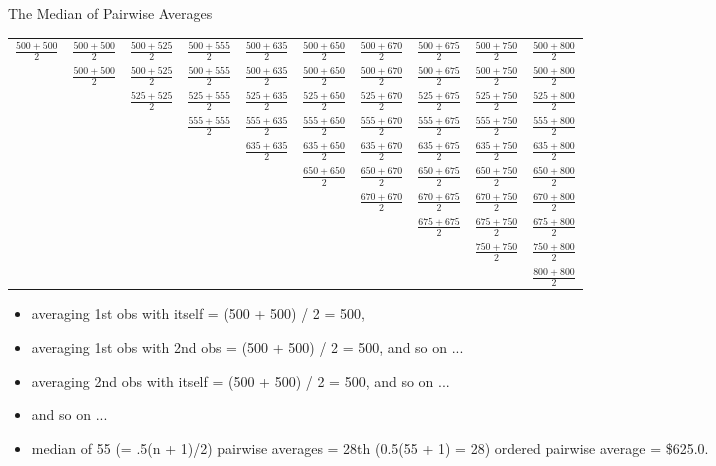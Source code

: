 \documentclass[14pt]{beamer}\usepackage[]{graphicx}\usepackage[]{color}
\begin{document}
\begin{frame}[fragile]{The Median of Pairwise Averages}

\begin{table}[ht]
\centering
{\tiny{
\begin{tabular}{@{}cccccccccc @{}} 
$\frac{500+500}{2}$ & $\frac{500+500}{2}$ & $\frac{500+525}{2}$ & $\frac{500+555}{2}$ & $\frac{500+635}{2}$ & $\frac{500+650}{2}$ & $\frac{500+670}{2}$ & $\frac{500+675}{2}$ & $\frac{500+750}{2}$ & $\frac{500+800}{2}$ \\
     & $\frac{500+500}{2}$ & $\frac{500+525}{2}$ & $\frac{500+555}{2}$ & $\frac{500+635}{2}$ & $\frac{500+650}{2}$ & $\frac{500+670}{2}$ & $\frac{500+675}{2}$ & $\frac{500+750}{2}$ & $\frac{500+800}{2}$ \\
     & & $\frac{525+525}{2}$ & $\frac{525+555}{2}$ & $\frac{525+635}{2}$ & $\frac{525+650}{2}$ & $\frac{525+670}{2}$ & $\frac{525+675}{2}$ & $\frac{525+750}{2}$ & $\frac{525+800}{2}$ \\
     & & & $\frac{555+555}{2}$ & $\frac{555+635}{2}$ & $\frac{555+650}{2}$ & $\frac{555+670}{2}$ & $\frac{555+675}{2}$ & $\frac{555+750}{2}$ & $\frac{555+800}{2}$ \\
     & & & & $\frac{635+635}{2}$ & $\frac{635+650}{2}$ & $\frac{635+670}{2}$ & $\frac{635+675}{2}$ & $\frac{635+750}{2}$ & $\frac{635+800}{2}$ \\
     & & & & & $\frac{650+650}{2}$ & $\frac{650+670}{2}$ & $\frac{650+675}{2}$ & $\frac{650+750}{2}$ & $\frac{650+800}{2}$ \\
     & & & & & & $\frac{670+670}{2}$ & $\frac{670+675}{2}$ & $\frac{670+750}{2}$ & $\frac{670+800}{2}$ \\
     & & & & & & & $\frac{675+675}{2}$ & $\frac{675+750}{2}$ & $\frac{675+800}{2}$ \\
     & & & & & & & & $\frac{750+750}{2}$ & $\frac{750+800}{2}$ \\ 
     & & & & & & & & & $\frac{800+800}{2}$ \\
\end{tabular}
}}
\end{table}

{\scriptsize{
\begin{itemize}
\item averaging 1st obs with itself = (500 + 500) / 2 = 500,
\item averaging 1st obs with 2nd obs = (500 + 500) / 2 = 500, and so on ...  
\item averaging 2nd obs with itself = (500 + 500) / 2 = 500, and so on ...  
\item and so on ...
\item median of 55 (= .5(n + 1)/2) pairwise averages = 28th (0.5(55 + 1) = 28)  ordered pairwise average = \$625.0.
\end{itemize}
}}
\end{frame}
\end{document}
